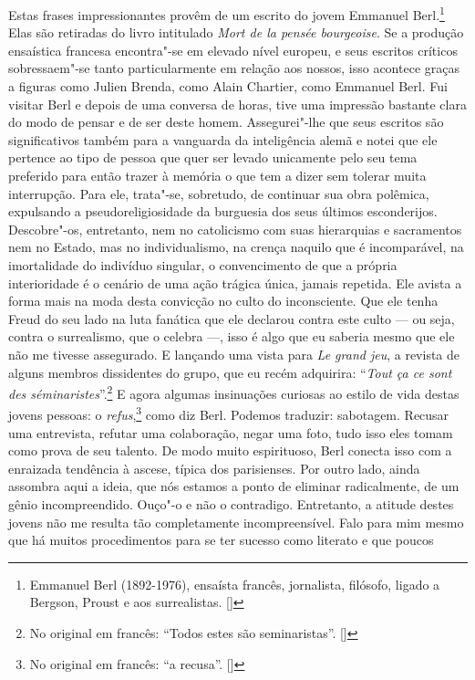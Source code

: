 Estas frases impressionantes provêm de um escrito do jovem Emmanuel
Berl.\footnote{Emmanuel Berl (1892-1976), ensaísta francês,
  jornalista, filósofo, ligado a Bergson, Proust e aos surrealistas. []}
Elas são retiradas do livro intitulado \emph{Mort de la pensée
bourgeoise}. Se a produção ensaística francesa encontra"-se em elevado
nível europeu, e seus escritos críticos sobressaem"-se tanto
particularmente em relação aos nossos, isso acontece graças a figuras
como Julien Brenda, como Alain Chartier, como Emmanuel Berl. Fui visitar
Berl e depois de uma conversa de horas, tive uma impressão bastante
clara do modo de pensar e de ser deste homem. Assegurei"-lhe que seus
escritos são significativos também para a vanguarda da inteligência
alemã e notei que ele pertence ao tipo de pessoa que quer ser levado
unicamente pelo seu tema preferido para então trazer à memória o que tem
a dizer sem tolerar muita interrupção. Para ele, trata"-se, sobretudo, de
continuar sua obra polêmica, expulsando a pseudoreligiosidade da
burguesia dos seus últimos esconderijos. Descobre"-os, entretanto, nem no
catolicismo com suas hierarquias e sacramentos nem no Estado, mas no
individualismo, na crença naquilo que é incomparável, na imortalidade do
indivíduo singular, o convencimento de que a própria interioridade é o
cenário de uma ação trágica única, jamais repetida. Ele avista a forma
mais na moda desta convicção no culto do inconsciente. Que ele tenha
Freud do seu lado na luta fanática que ele declarou contra este culto ---
ou seja, contra o surrealismo, que o celebra ---, isso é algo que eu
saberia mesmo que ele não me tivesse assegurado. E lançando uma vista
para \emph{Le grand jeu}, a revista de alguns membros dissidentes do
grupo, que eu recém adquirira: ``\emph{Tout ça ce sont des
séminaristes}''.\footnote{No original em francês: ``Todos estes são
  seminaristas''. []} E agora algumas insinuações curiosas ao estilo de
vida destas jovens pessoas: o \emph{refus},\footnote{No original em
  francês: ``a recusa''. []} como diz Berl. Podemos traduzir: sabotagem.
Recusar uma entrevista, refutar uma colaboração, negar uma foto, tudo
isso eles tomam como prova de seu talento. De modo muito espirituoso,
Berl conecta isso com a enraizada tendência à ascese, típica dos
parisienses. Por outro lado, ainda assombra aqui a ideia, que nós
estamos a ponto de eliminar radicalmente, de um gênio incompreendido.
Ouço"-o e não o contradigo. Entretanto, a atitude destes jovens não me
resulta tão completamente incompreensível. Falo para mim mesmo que há
muitos procedimentos para se ter sucesso como literato e que poucos
